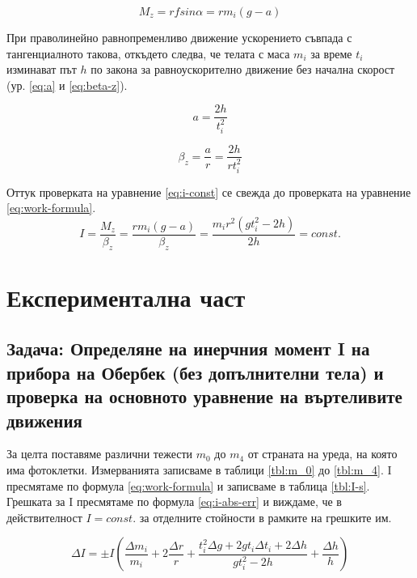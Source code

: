 \documentclass[12pt]{article}
\begin{document}
\begin{equation}\label{eq:M-z}
    M_z = rfsin\alpha = rm_i(g-a)
\end{equation}

При праволинейно равнопременливо движение ускорението съвпада с тангенциалното такова, откъдето следва, че телата с маса $m_i$ за време $t_i$ изминават път $h$ по закона за равноускорително движение без начална скорост (ур. \ref{eq:a} и \ref{eq:beta-z}).

\begin{equation}\label{eq:a}
    a = \frac{2h}{t_i^2}
\end{equation}

\begin{equation}\label{eq:beta-z}
    \beta_z = \frac{a}{r} = \frac{2h}{rt_i^2}
\end{equation}

Оттук проверката на уравнение \ref{eq:i-const} се свежда до проверката на уравнение \ref{eq:work-formula}.
\begin{equation}\label{eq:work-formula}
    I = \frac{M_z}{\beta_z} = \frac{rm_i(g-a)}{\beta_z} = \frac{m_ir^2(gt_i^2 - 2h)}{2h} = const.
\end{equation}


\section{Експериментална част}

\subsection{Задача: Определяне на инерчния момент I на прибора на Обербек (без допълнителни тела) и проверка на основното уравнение на въртеливите движения}

За целта поставяме различни тежести $m_0$ до $m_4$ от страната на уреда, на която има фотоклетки. Измерванията записваме в таблици \ref{tbl:m_0} до \ref{tbl:m_4}. I пресмятаме по формула \ref{eq:work-formula} и записваме в таблица \ref{tbl:I-s}. Грешката за I пресмятаме по формула \ref{eq:i-abs-err} и виждаме, че в действителност $I = const.$ за отделните стойности в рамките на грешките им.

\begin{equation}\label{eq:i-abs-err}
    \Delta I = \pm I \left(\frac{\Delta m_i}{m_i} + 2 \frac{\Delta r}{r} + \frac{t_i^2\Delta g + 2gt_i\Delta t_i + 2\Delta h}{gt_i^2 - 2h} + \frac{\Delta h}{h}\right)
\end{equation}
\end{document}
